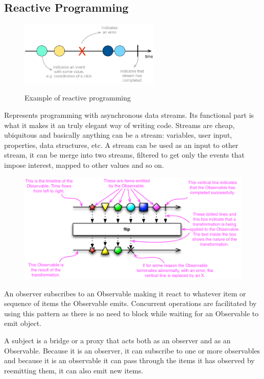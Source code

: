 \documentclass[12 pct]{report}
\begin{document}
\subsection*{Reactive Programming}

\begin{figure}[H]
\includegraphics[width=0.6\textwidth]{streams}
\centering
\label{fig:reactive-pgrogramming}
\caption{Example of reactive programming }
\end{figure}

Represents programming with asynchronous data streams. Its functional part is what it makes it an truly elegant way of writing code. Streams are cheap, ubiquitous and basically anything can be a stream: variables, user input, properties, data structures, etc. A stream can be used as an input to other stream, it can be merge into two streams, filtered to get only the events that impose interest, mapped to other  values and so on.

\begin{figure}[H]
\includegraphics[width=1.0\textwidth]{observable-doc}
\centering
\label{fig:feature-points}
\caption{ \cite{reactivexDocumentation} }
\end{figure}


An observer subscribes to an Observable making it react to whatever item or sequence of items the Observable emits. Concurrent operations are facilitated by using this pattern as there is no need to block while waiting for an Observable to emit object.

A subject is a bridge or a proxy that acts both as an observer and as an Observable. Because it is an observer, it can subscribe to one or more observables and because it is an observable it can pass through the items it has observed by reemitting them, it can also emit new items.
\end{document}
